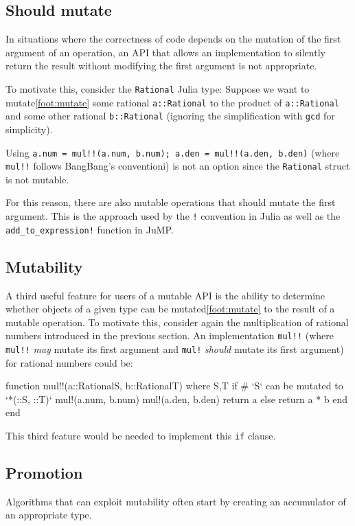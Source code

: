 \documentclass{juliacon}
\begin{document}
\subsection{Should mutate}
In situations where the correctness of code depends on
the mutation of the first argument of an operation,
an API that allows an implementation to silently return the
result without modifying the first argument is not appropriate.

To motivate this, consider the \lstinline|Rational| Julia type:
Suppose we want to mutate\cref{foot:mutate} some rational \lstinline|a::Rational| to the
product of \lstinline|a::Rational| and some other rational \lstinline|b::Rational|
(ignoring the simplification with \lstinline|gcd| for simplicity).

Using \lstinline|a.num = mul!!(a.num, b.num); a.den = mul!!(a.den, b.den)|
(where \lstinline|mul!!| follows BangBang's conventioni)
is not an option since
the \lstinline|Rational| struct is not mutable.

For this reason, there are also mutable operations that should mutate the first argument.
This is the approach used by the \lstinline|!| convention in Julia
as well as the \lstinline|add_to_expression!| function in JuMP.

\subsection{Mutability}
A third useful feature for users of a mutable API is the ability to
determine whether objects of a given type can be mutated\cref{foot:mutate} to the result of a mutable operation.
To motivate this, consider again the multiplication of rational numbers introduced in the previous section.
An implementation \lstinline|mul!!| (where \lstinline|mul!!| \emph{may} mutate its first argument and \lstinline|mul!| \emph{should} mutate its first argument)
for rational numbers could be:
\begin{jllisting}
function mul!!(a::Rational{S}, b::Rational{T}) where {S,T}
    if # `S` can be mutated to `*(::S, ::T)`
        mul!(a.num, b.num)
        mul!(a.den, b.den)
        return a
    else
        return a * b
    end
end
\end{jllisting}
This third feature would be needed to implement this \lstinline|if| clause.

\subsection{Promotion}
Algorithms that can exploit mutability often start by creating an accumulator of
an appropriate type.
\end{document}
